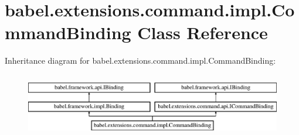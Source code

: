 \hypertarget{classbabel_1_1extensions_1_1command_1_1impl_1_1_command_binding}{\section{babel.\-extensions.\-command.\-impl.\-Command\-Binding Class Reference}
\label{classbabel_1_1extensions_1_1command_1_1impl_1_1_command_binding}
}
Inheritance diagram for babel.\-extensions.\-command.\-impl.\-Command\-Binding\-:\begin{figure}[H]
\begin{center}
\leavevmode
\includegraphics[height=2.818792cm]{classbabel_1_1extensions_1_1command_1_1impl_1_1_command_binding}
\end{center}
\end{figure}
